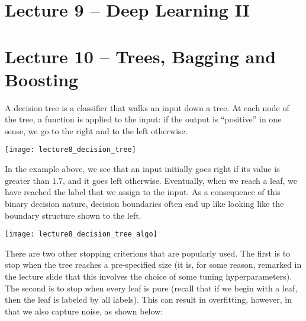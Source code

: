\documentclass[../main.tex]{subfiles}
\begin{document}
\section{Lecture 9 -- Deep Learning II}

\section{Lecture 10 -- Trees, Bagging and Boosting}


    \begin{definition}
        A decision tree is a classifier that walks an input down a tree. At each node of the
        tree, a function is applied to the input: if the output is ``positive'' in one sense,
        we go to the right and to the left otherwise.
    \end{definition}

    \begin{center}
        \texttt{[image: lecture8\_decision\_tree]}
    \end{center}

    \begin{example}
        In the example above, we see that an input initially goes right if its value is
        greater than $1.7$, and it goes left otherwise. Eventually, when we reach a leaf,
        we have reached the label that we assign to the input. As a consequence of this binary
        decision nature, decision boundaries often end up like looking like the boundary
        structure shown to the left.
    \end{example}

    \begin{center}
        \texttt{[image: lecture8\_decision\_tree\_algo]}
    \end{center}

    \begin{remark}
       There are two other stopping criterions that are popularly used. The first is to
       stop when the tree reaches a pre-specified size (it is, for some reason, remarked
       in the lecture slide that this involves the choice of some tuning hyperparameters).
       The second is to stop when every leaf is pure (recall that if we begin with a leaf,
       then the leaf is labeled by all labels). This can result in overfitting, however,
       in that we also capture noise, as shown below:
    \end{remark}
\end{document}

